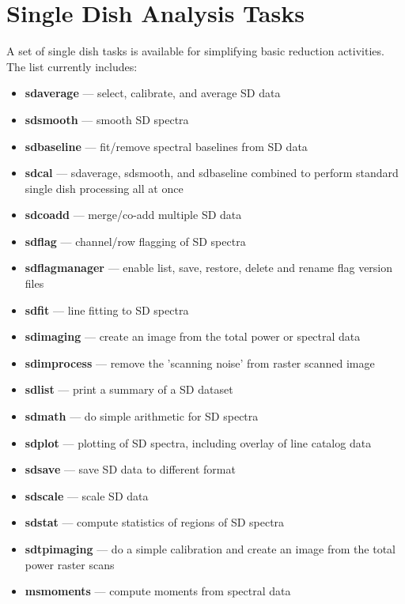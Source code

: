 \section{Single Dish Analysis Tasks}
\label{section:sd.sdtasks}

A set of single dish tasks is available for simplifying basic
reduction activities.  The list currently includes:

\begin{itemize}

\item {\bf sdaverage} --- select, calibrate, and average SD data

\item {\bf sdsmooth} --- smooth SD spectra

\item {\bf sdbaseline} --- fit/remove spectral baselines from SD data

\item {\bf sdcal} --- sdaverage, sdsmooth, and sdbaseline combined to perform standard single dish processing all at once 

\item {\bf sdcoadd} --- merge/co-add multiple SD data

\item {\bf sdflag} --- channel/row flagging of SD spectra

\item {\bf sdflagmanager} --- enable list, save, restore, delete and rename flag version files

\item {\bf sdfit} --- line fitting to SD spectra

\item {\bf sdimaging} --- create an image from the total power or spectral data

\item{\bf sdimprocess} --- remove the 'scanning noise' from raster scanned image  

\item {\bf sdlist} --- print a summary of a SD dataset

\item {\bf sdmath} --- do simple arithmetic for SD spectra 

\item {\bf sdplot} --- plotting of SD spectra, including overlay of line
catalog data

\item {\bf sdsave} --- save SD data to different format

\item {\bf sdscale} --- scale SD data
 
\item {\bf sdstat} --- compute statistics of regions of SD spectra

\item {\bf sdtpimaging} --- do a simple calibration and create an image from the total power raster scans
 
\item{\bf msmoments} --- compute moments from spectral data

\end{itemize}

